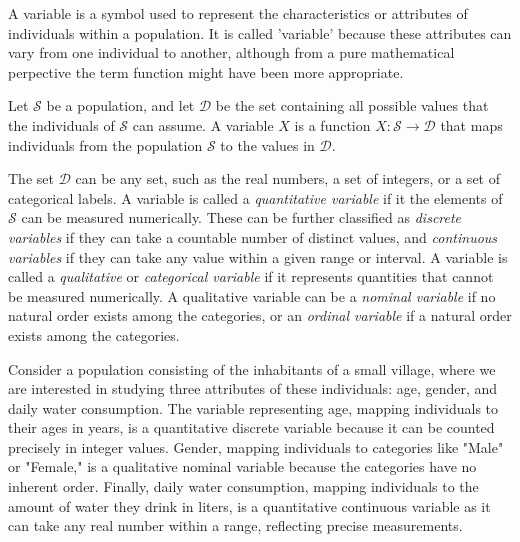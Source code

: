 A variable is a symbol used to represent the characteristics or attributes of individuals within a population. It is called 'variable' because these attributes can vary from one individual to another, although from a pure mathematical perpective the term function might have been more appropriate.

\begin{definition}
Let $\mathcal{S}$ be a population, and let $\mathcal{D}$ be the set containing all possible values that the individuals of $\mathcal{S}$ can assume. A variable $X$ is a function $X: \mathcal{S} \rightarrow \mathcal{D}$ that maps individuals from the population $\mathcal{S}$ to the values in $\mathcal{D}$.
\end{definition}

The set $\mathcal{D}$ can be any set, such as the real numbers, a set of integers, or a set of categorical labels. A variable is called a \emph{quantitative variable} if it the elements of $\mathcal{S}$ can be measured numerically. These can be further classified as \emph{discrete variables} if they can take a countable number of distinct values, and \emph{continuous variables} if they can take any value within a given range or interval. A variable is called a \emph{qualitative} or \emph{categorical variable} if it represents quantities that cannot be measured numerically. A qualitative variable can be a \emph{nominal variable} if no natural order exists among the categories, or an \emph{ordinal variable} if a natural order exists among the categories.

\begin{example}
Consider a population consisting of the inhabitants of a small village, where we are interested in studying three attributes of these individuals: age, gender, and daily water consumption. The variable representing age, mapping individuals to their ages in years, is a quantitative discrete variable because it can be counted precisely in integer values. Gender, mapping individuals to categories like "Male" or "Female," is a qualitative nominal variable because the categories have no inherent order. Finally, daily water consumption, mapping individuals to the amount of water they drink in liters, is a quantitative continuous variable as it can take any real number within a range, reflecting precise measurements.
\end{example}

